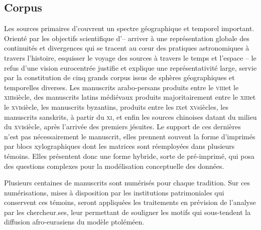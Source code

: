 \hypertarget{corpus}{%
\subsection{Corpus}\label{corpus}}

Les sources primaires d'\eida couvrent un spectre géographique et
temporel important. Orienté par les objectifs scientifique d'\eida --
arriver à une représentation globale des continuités et divergences qui
se tracent au cœur des pratiques astronomiques à travers l'histoire,
esquisser le voyage des sources à travers le temps et l'espace -- le
refus d'une vision eurocentrée justifie et explique une représentativité
large, servie par la constitution de cinq grands corpus issus de sphères
géographiques et temporelles diverses. Les manuscrits arabo-persans
produits entre le \textsc{viii}\ieme et le \textsc{xiii}\ieme siècle, des manuscrits latins
médiévaux produits majoritairement entre le \textsc{xiii}\ieme et le \textsc{xvi}\ieme siècle, les
manuscrits byzantins, produits entre les \textsc{ix}\ieme et \textsc{xv}\ieme siècles, les
manuscrits sanskrits, à partir du \textsc{xi}\ieme, et enfin les sources chinoises
datant du milieu du \textsc{xvi}\ieme siècle, après l'arrivée des premiers jésuites.
Le support de ces dernières n'est pas nécessairement le manuscrit, elles
prennent souvent la forme d'imprimés par blocs xylographiques dont les
matrices sont réemployées dans plusieurs témoins. Elles présentent donc
une forme hybride, sorte de pré-imprimé, qui posa des questions
complexes pour la modélisation conceptuelle des données.

Plusieurs centaines de manuscrits sont numérisés pour chaque tradition.
Sur ces numérisations, mises à disposition par les institutions
patrimoniales qui conservent ces témoins, seront appliquées les
traitements en prévision de l'analyse par les chercheur.ses, leur
permettant de souligner les motifs qui sous-tendent la diffusion
afro-eurasiens du modèle ptoléméen.

